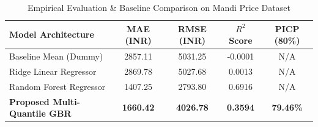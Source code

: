 \begin{table}[htbp]
\caption{Empirical Evaluation \& Baseline Comparison on Mandi Price Dataset}
\label{tab:model_evaluation}
\centering
\begin{tabular}{lcccc}
\hline
\textbf{Model Architecture} & \textbf{MAE (INR)} & \textbf{RMSE (INR)} & \textbf{$R^2$ Score} & \textbf{PICP (80\%)} \\
\hline
Baseline Mean (Dummy) & 2857.11 & 5031.25 & -0.0001 & N/A \\
Ridge Linear Regressor & 2869.78 & 5027.68 & 0.0013 & N/A \\
Random Forest Regressor & 1407.25 & 2793.80 & 0.6916 & N/A \\
\textbf{Proposed Multi-Quantile GBR} & \textbf{1660.42} & \textbf{4026.78} & \textbf{0.3594} & \textbf{79.46\%} \\
\hline
\end{tabular}
\end{table}
